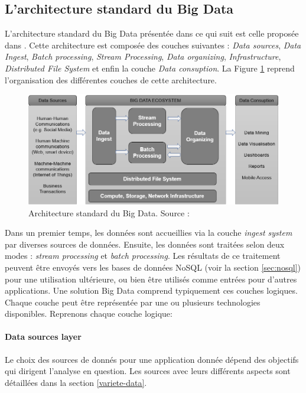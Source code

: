 		\subsection{L'architecture standard du Big Data}
		
		L'architecture standard du Big Data présentée dans ce qui suit est celle proposée dans  \cite{anil-big-data}. Cette architecture  est composée des couches suivantes :  \textit{Data sources}, \textit{Data Ingest}, \textit{Batch processing}, \textit{Stream Processing}, \textit{Data organizing}, \textit{Infrastructure}, \textit{Distributed File System} et enfin la couche \textit{Data consuption}. 
		 La Figure \ref{fig:bigdata-architecture} reprend l'organisation des différentes couches de cette architecture.
		 		\begin{figure}[h]
		 	\captionsetup{justification = centering}
		 	\centering
		 	\includegraphics[width=\linewidth]{illustrations/bigdata-architecture}
		 	\caption{Architecture standard du Big Data. Source :  \cite{anil-big-data}}
		 	\label{fig:bigdata-architecture}
		 \end{figure}
		
		Dans un premier temps, les données sont   accueillies   via la couche  \textit{ingest system} par diverses sources de données. Ensuite, les données sont traitées selon deux modes :  \textit{stream processing } et  \textit{batch processing}.  Les résultats de ce traitement peuvent être envoyés vers les bases de données NoSQL (voir la section \ref{sec:nosql}) pour une utilisation ultérieure, ou bien être utilisés  comme entrées pour d'autres applications.  Une solution Big Data comprend typiquement  ces  couches logiques. Chaque  couche peut être représentée par une ou plusieurs technologies disponibles. Reprenons chaque couche logique:
		
		
			\paragraph{Data sources layer} Le choix des sources de donnés pour une application donnée dépend des objectifs qui dirigent l'analyse en question. Les sources avec leurs différents aspects sont détaillées dans la section \ref{variete-data}.
